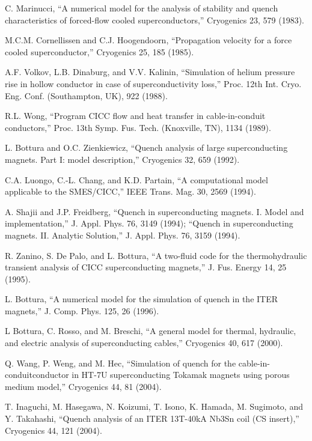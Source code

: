 \noindent [1.10] C. Marinucci, ``A numerical model for the analysis of stability and quench characteristics of forced-flow cooled superconductors,” Cryogenics 23, 579 (1983).

\noindent [1.11] M.C.M. Cornellissen and C.J. Hoogendoorn, ``Propagation velocity for a force
cooled superconductor,” Cryogenics 25, 185 (1985).

\noindent [1.12] A.F. Volkov, L.B. Dinaburg, and V.V. Kalinin, ``Simulation of helium pressure
rise in hollow conductor in case of superconductivity loss,” Proc. 12th Int. Cryo.
Eng. Conf. (Southampton, UK), 922 (1988).

\noindent [1.13] R.L. Wong, ``Program CICC flow and heat transfer in cable-in-conduit conductors,”
Proc. 13th Symp. Fus. Tech. (Knoxville, TN), 1134 (1989).

\noindent [1.14] L. Bottura and O.C. Zienkiewicz, ``Quench analysis of large superconducting magnets. Part I: model description,” Cryogenics 32, 659 (1992).

\noindent [1.15] C.A. Luongo, C.-L. Chang, and K.D. Partain, ``A computational model applicable
to the SMES/CICC,” IEEE Trans. Mag. 30, 2569 (1994).

\noindent [1.16] A. Shajii and J.P. Freidberg, ``Quench in superconducting magnets. I. Model and
implementation,” J. Appl. Phys. 76, 3149 (1994); ``Quench in superconducting
magnets. II. Analytic Solution,” J. Appl. Phys. 76, 3159 (1994).

\noindent [1.17] R. Zanino, S. De Palo, and L. Bottura, ``A two-fluid code for the thermohydraulic
transient analysis of CICC superconducting magnets,” J. Fus. Energy 14,
25 (1995).

\noindent [1.18] L. Bottura, ``A numerical model for the simulation of quench in the ITER magnets,”
J. Comp. Phys. 125, 26 (1996).

\noindent [1.19] L Bottura, C. Rosso, and M. Breschi, ``A general model for thermal, hydraulic,
and electric analysis of superconducting cables,” Cryogenics 40, 617 (2000).

\noindent [1.20] Q. Wang, P. Weng, and M. Hec, ``Simulation of quench for the cable-in-conduitconductor in HT-7U superconducting Tokamak magnets using porous medium
model,” Cryogenics 44, 81 (2004).

\noindent [1.21] T. Inaguchi, M. Hasegawa, N. Koizumi, T. Isono, K. Hamada, M. Sugimoto, and
Y. Takahashi, ``Quench analysis of an ITER 13T-40kA Nb3Sn coil (CS insert),”
Cryogenics 44, 121 (2004).

